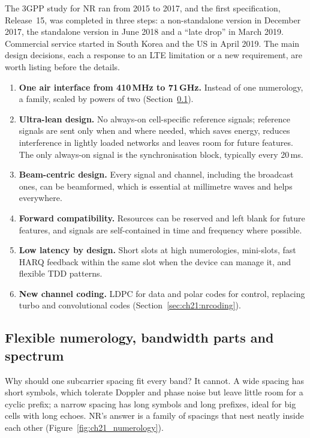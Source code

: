 The 3GPP study for NR ran from 2015 to 2017, and the first specification, Release~15, was completed
in three steps: a non-standalone version in December 2017, the standalone version in June 2018 and a
``late drop'' in March 2019. Commercial service started in South Korea and the US in April 2019. The
main design decisions, each a response to an LTE limitation or a new requirement, are worth listing
before the details.
\begin{enumerate}
\item \textbf{One air interface from 410\,MHz to 71\,GHz.} Instead of one numerology, a family,
scaled by powers of two (Section~\ref{sec:ch21:numerology}).
\item \textbf{Ultra-lean design.} No always-on cell-specific reference signals; reference signals
are sent only when and where needed, which saves energy, reduces interference in lightly loaded
networks and leaves room for future features. The only always-on signal is the synchronisation
block, typically every 20\,ms.
\item \textbf{Beam-centric design.} Every signal and channel, including the broadcast ones, can be
beamformed, which is essential at millimetre waves and helps everywhere.
\item \textbf{Forward compatibility.} Resources can be reserved and left blank for future features,
and signals are self-contained in time and frequency where possible.
\item \textbf{Low latency by design.} Short slots at high numerologies, mini-slots, fast HARQ
feedback within the same slot when the device can manage it, and flexible TDD patterns.
\item \textbf{New channel coding.} LDPC for data and polar codes for control, replacing turbo and
convolutional codes (Section~\ref{sec:ch21:nrcoding}).
\end{enumerate}

\subsection{Flexible numerology, bandwidth parts and spectrum}
\label{sec:ch21:numerology}

Why should one subcarrier spacing fit every band? It cannot. A wide spacing has short symbols, which
tolerate Doppler and phase noise but leave little room for a cyclic prefix; a narrow spacing has long
symbols and long prefixes, ideal for big cells with long echoes. NR's answer is a family of spacings
that nest neatly inside each other (Figure~\ref{fig:ch21_numerology}).


